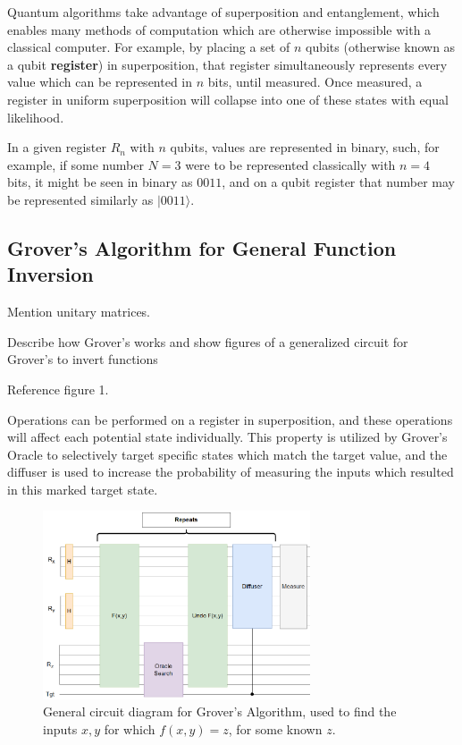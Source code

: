 \documentclass[twocolumn]{cinc}
\begin{document}
Quantum algorithms take advantage of superposition and entanglement,
which enables many methods of computation which are otherwise impossible
with a classical computer. For example, by placing a set of $n$ qubits 
(otherwise known as a qubit \textbf{register}) in superposition, that register
simultaneously represents every value which can be represented in $n$ bits,
until measured. Once measured, a register in uniform superposition will 
collapse into one of these states with equal likelihood.

In a given register $R_n$ with $n$ qubits, values are represented in binary,
such, for example, if some number $N=3$ were to be represented classically
with $n=4$ bits, it might be seen in binary as $0011$, and on a qubit
register that number may be represented similarly as $| 0011 \rangle$.

  \subsection{Grover's Algorithm for General Function Inversion} 

  Mention unitary matrices.

  Describe how Grover's works and show figures of a generalized
  circuit for Grover's to invert functions

  Reference figure 1.

  Operations can be performed on a register in superposition, and these operations
  will affect each potential state individually. This property is utilized by
  Grover's Oracle to selectively target specific states which match the target
  value, and the diffuser is used to increase the probability of measuring the
  inputs which resulted in this marked target state.

  \begin{figure}[h]
  \includegraphics[width=7.9cm]{grover_inversion.png}
  \caption{General circuit diagram for Grover's Algorithm, used to find 
  the inputs $x, y$ for which $f(x,y)=z$, for some known $z$.}
  \label{FIGURA1}
  \end{figure}
\end{document}
